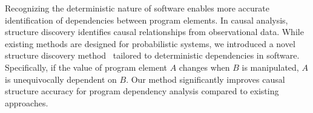\documentclass{article}
\begin{document}





Recognizing the deterministic nature of software enables more accurate identification of dependencies between program elements. In causal analysis, structure discovery identifies causal relationships from observational data. While existing methods are designed for probabilistic systems, we introduced a novel structure discovery method~\cite{leeCausalProgramDependence2025a} tailored to deterministic dependencies in software. Specifically, if the value of program element $A$ changes when $B$ is manipulated, $A$ is unequivocally dependent on $B$. Our method significantly improves causal structure accuracy for program dependency analysis compared to existing approaches.

\end{document}
